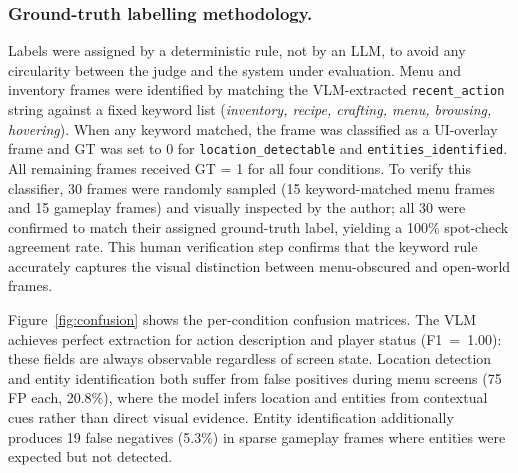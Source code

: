\documentclass{article}
\begin{document}
\subsubsection{Ground-truth labelling methodology.}
Labels were assigned by a deterministic rule, not by an LLM, to avoid any circularity between the judge and the system under evaluation.
Menu and inventory frames were identified by matching the VLM-extracted \texttt{recent\_action} string against a fixed keyword list (\textit{inventory, recipe, crafting, menu, browsing, hovering}). When any keyword matched, the frame was classified as a UI-overlay frame and GT was set to 0 for \texttt{location\_detectable} and \texttt{entities\_identified}. All remaining frames received GT = 1 for all four conditions. To verify this classifier, 30 frames were randomly sampled (15 keyword-matched menu frames and 15 gameplay frames) and visually inspected by the author; all 30 were confirmed to match their assigned ground-truth label, yielding a 100\% spot-check agreement rate. This human verification step confirms that the keyword rule accurately captures the visual distinction between menu-obscured and open-world frames.

\begin{table}[htbp]
\centering
\caption{Stage~1 VLM extraction accuracy across 360 frames (1{,}440 labels).}
\label{tab:stage1}
\end{table} 

Figure~\ref{fig:confusion} shows the per-condition confusion matrices. The VLM achieves perfect extraction for action description and player status (F1~=~1.00): these fields are always observable regardless of screen state. Location detection and entity identification both suffer from false positives during menu screens (75 FP each, 20.8\%), where the model infers location and entities from contextual cues rather than direct visual evidence. Entity identification additionally produces 19 false negatives (5.3\%) in sparse gameplay frames where entities were expected but not detected.
\end{document}
